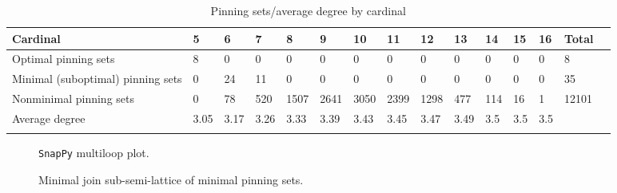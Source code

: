 \documentclass{article}%
\begin{document}
\begin{table}[ht]
	\caption{Pinning sets/average degree by cardinal}
	\centering
	\renewcommand{\arraystretch}{1.5}
	\begin{tabularx}{\textwidth}{lXXXXXXXXXXXXXX}
		\toprule
			Cardinal & 5 & 6 & 7 & 8 & 9 & 10 & 11 & 12 & 13 & 14 & 15 & 16 & Total\\
			\hline
			Optimal pinning sets & 8 & 0 & 0 & 0 & 0 & 0 & 0 & 0 & 0 & 0 & 0 & 0 & 8 \\
			Minimal (suboptimal) pinning sets & 0 & 24 & 11 & 0 & 0 & 0 & 0 & 0 & 0 & 0 & 0 & 0 & 35 \\
			Nonminimal pinning sets & 0 & 78 & 520 & 1507 & 2641 & 3050 & 2399 & 1298 & 477 & 114 & 16 & 1 & 12101 \\
			Average degree & 3.05 & 3.17 & 3.26 & 3.33 & 3.39 & 3.43 & 3.45 & 3.47 & 3.49 & 3.5 & 3.5 & 3.5 &  \\
		\bottomrule \\ 
	\end{tabularx}
\end{table}

\begin{multicols}{2}
\begin{figure}[H]
\centering

\caption{\texttt{SnapPy} multiloop plot.}
\label{fig:tex/img/[[8, 28, 1, 9], [9, 25, 10, 24], [7, 23, 8, 24], [27, 16, 28, 17], [1, 16, 2, 15], [25, 15, 26, 14], [10, 6, 11, 7], [22, 17, 23, 18], [26, 2, 27, 3], [13, 20, 14, 21], [5, 19, 6, 20], [11, 19, 12, 18.svg}
\end{figure}
\columnbreak

\begin{figure}[H]
\centering
\scalebox{0.8}{}
\caption{Minimal join sub-semi-lattice of minimal pinning sets.}
\label{fig:tex/img/[[8, 28, 1, 9], [9, 25, 10, 24], [7, 23, 8, 24], [27, 16, 28, 17], [1, 16, 2, 15], [25, 15, 26, 14], [10, 6, 11, 7], [22, 17, 23, 18], [26, 2, 27, 3], [13, 20, 14, 21], [5, 19, 6, 20], [11, 19, 12, 18.pgf}
\end{figure}
\end{multicols}
\end{document}
